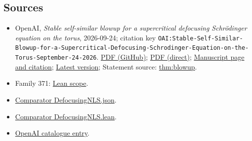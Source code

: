 \documentclass[11pt]{article}
\begin{document}
\subsection{Sources}
\begin{itemize}
\item OpenAI, \emph{Stable self-similar blowup for a supercritical defocusing Schrödinger equation on the torus}, 2026-09-24; citation key \texttt{OAI:Stable-Self-Similar-Blowup-for-a-Supercritical-Defocusing-Schrodinger-Equation-on-the-Torus-September-24-2026}. \href{https://github.com/openai/math/blob/adc7f1241b42e322a6451854ab7e4b4c146bf78a/preprints/Stable-Self-Similar-Blowup-for-a-Supercritical-Defocusing-Schrodinger-Equation-on-the-Torus-September-24-2026/paper.pdf}{PDF (GitHub)}; \href{https://github.com/openai/math/raw/adc7f1241b42e322a6451854ab7e4b4c146bf78a/preprints/Stable-Self-Similar-Blowup-for-a-Supercritical-Defocusing-Schrodinger-Equation-on-the-Torus-September-24-2026/paper.pdf}{PDF (direct)}; \href{https://github.com/openai/math/blob/adc7f1241b42e322a6451854ab7e4b4c146bf78a/preprints/Stable-Self-Similar-Blowup-for-a-Supercritical-Defocusing-Schrodinger-Equation-on-the-Torus-September-24-2026/README.md}{Manuscript page and citation}; \href{https://github.com/openai/math/blob/main/preprints/Stable-Self-Similar-Blowup-for-a-Supercritical-Defocusing-Schrodinger-Equation-on-the-Torus-September-24-2026/paper.pdf}{Latest version}; Statement source: \href{https://github.com/openai/math/blob/adc7f1241b42e322a6451854ab7e4b4c146bf78a/preprints/Stable-Self-Similar-Blowup-for-a-Supercritical-Defocusing-Schrodinger-Equation-on-the-Torus-September-24-2026/build/main.tex\#L67}{thm:blowup}.
\item Family 371: \href{https://github.com/openai/math/blob/adc7f1241b42e322a6451854ab7e4b4c146bf78a/lean/docs/371.md}{Lean scope}.
\item \href{https://github.com/openai/math/blob/adc7f1241b42e322a6451854ab7e4b4c146bf78a/lean/ComparatorChallenges/DefocusingNLS.json}{Comparator DefocusingNLS.json}.
\item \href{https://github.com/openai/math/blob/adc7f1241b42e322a6451854ab7e4b4c146bf78a/lean/ComparatorChallenges/DefocusingNLS.lean}{Comparator DefocusingNLS.lean}.
\item \href{https://github.com/openai/math/blob/adc7f1241b42e322a6451854ab7e4b4c146bf78a/CONTENTS.md}{OpenAI catalogue entry}.
\end{itemize}
\end{document}
